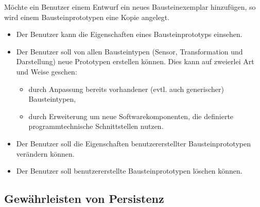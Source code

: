 \documentclass[parskip=full]{scrartcl}
\begin{document}
Möchte ein Benutzer einem Entwurf ein neues Bausteinexemplar hinzufügen, so wird einem \gls{Bausteinprototyp}en eine Kopie angelegt.

\begin{itemize}
	
	\item 
	\begin{SollKrit} 
		Der Benutzer kann die Eigenschaften eines Bausteinprototyps einsehen.
	\end{SollKrit}
	
	\item Der Benutzer soll von allen Bausteintypen (Sensor, Transformation und Darstellung) neue Prototypen erstellen können. Dies kann auf zweierlei Art und Weise geschen: 
	
	\begin{itemize}
		
		\item 
		\begin{SollKrit} 
			durch Anpassung bereits vorhandener (evtl. auch generischer) Bausteintypen,
		\end{SollKrit}
		
		\item 
		\begin{WunschKrit} 
			durch Erweiterung um neue Softwarekomponenten, die definierte programmtechnische Schnittstellen nutzen.
		\end{WunschKrit}
		
	\end{itemize}
	
	\item 
	\begin{SollKrit}
		Der Benutzer soll die Eigenschaften benutzererstellter Bausteinprototypen verändern können.
	\end{SollKrit}
	
	\item 
	\begin{SollKrit}
		Der Benutzer soll benutzererstellte Bausteinprototypen löschen können.
	\end{SollKrit}
	
	
\end{itemize}

\subsection{Gewährleisten von Persistenz}
\end{document}
